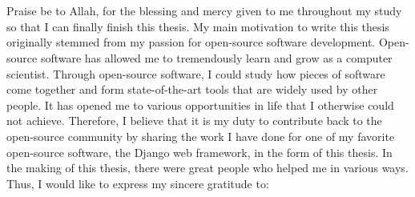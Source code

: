 \chapter*{\kataPengantar}

Praise be to Allah, for the blessing and mercy given to me throughout my study
so that I can finally finish this thesis. My main motivation to write this
thesis originally stemmed from my passion for open-source software development.
Open-source software has allowed me to tremendously learn and grow as a
computer scientist. Through open-source software, I could study how pieces of
software come together and form state-of-the-art tools that are widely used by
other people. It has opened me to various opportunities in life that I
otherwise could not achieve. Therefore, I believe that it is my duty to
contribute back to the open-source community by sharing the work I have done
for one of my favorite open-source software, the Django web framework, in the
form of this thesis. In the making of this thesis, there were great people who
helped me in various ways. Thus, I would like to express my sincere gratitude
to:

